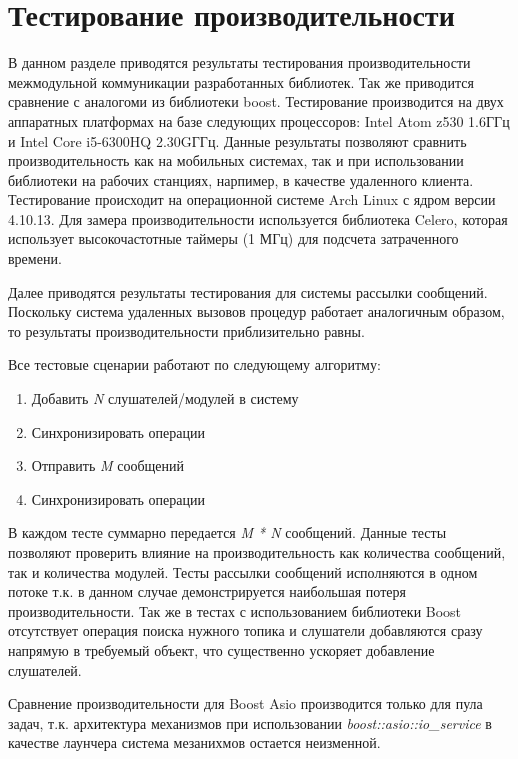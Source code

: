 \section{Тестирование производительности}

В данном разделе приводятся результаты тестирования производительности 
межмодульной коммуникации разработанных библиотек. Так же приводится сравнение 
с аналогоми из библиотеки boost. Тестирование производится на двух аппаратных 
платформах на базе следующих процессоров: Intel Atom z530 1.6ГГц и Intel Core 
i5-6300HQ 2.30GГГц. Данные результаты позволяют сравнить производительность как 
на мобильных системах, так и при использовании библиотеки на рабочих станциях, 
нарпимер, в качестве удаленного клиента. Тестирование происходит на 
операционной системе Arch Linux с ядром версии 4.10.13. Для замера 
производительности используется библиотека Celero, которая использует 
высокочастотные таймеры (1 МГц) для подсчета затраченного времени.

Далее приводятся результаты тестирования для системы рассылки сообщений. Поскольку система удаленных вызовов процедур работает аналогичным образом, то результаты производительности приблизительно равны.

Все тестовые сценарии работают по следующему алгоритму:

\begin{enumerate}
    \item Добавить \textit{N} слушателей/модулей в систему
    \item Синхронизировать операции
    \item Отправить \textit{M} сообщений
    \item Синхронизировать операции
\end{enumerate}

В каждом тесте суммарно передается \textit{M * N} сообщений. Данные тесты позволяют проверить влияние на производительность как количества сообщений, так и количества модулей. Тесты рассылки сообщений исполняются в одном потоке т.к. в данном случае демонстрируется наибольшая потеря производительности. Так же в тестах с использованием библиотеки Boost отсутствует операция поиска нужного топика и слушатели добавляются сразу напрямую в требуемый объект, что существенно ускоряет добавление слушателей.

Сравнение производительности для Boost Asio производится только для пула задач, т.к. архитектура механизмов при использовании \textit{boost::asio::io\_service} в качестве лаунчера система мезанихмов остается неизменной.


